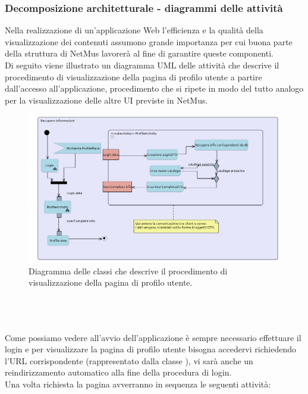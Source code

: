 \subsubsection{Decomposizione architetturale - diagrammi delle attivit\`a}
Nella realizzazione di un'applicazione Web l'efficienza e la
qualit\`a della visualizzazione dei contenuti assumono grande importanza per cui
buona parte della struttura di NetMus lavorer\`a al fine di garantire queste
componenti. \\
Di seguito viene illustrato un diagramma UML delle attivit\`a che descrive il
procedimento di visualizzazione della pagina di profilo utente a partire
dall'accesso all'applicazione, procedimento che si ripete in modo del tutto
analogo per la visualizzazione delle altre UI previste in NetMus.
\begin{figure}[h]
  \centering
  \includegraphics[width=16.5cm]{img/ST/profile.png}
\caption{Diagramma delle classi che descrive il procedimento di
visualizzazione della pagina di profilo utente.}
\end{figure}
\\\\\\Come possiamo vedere all'avvio dell'applicazione \`e sempre necessario
effettuare il login e per visualizzare la pagina di profilo utente bisogna accedervi
richiedendo l'URL corrispondente (rappresentato dalla classe ),
vi sar\`a anche un reindirizzamento automatico alla fine della procedura di
login.\\ 
Una volta richiesta la pagina avverranno in sequenza le seguenti attivit\`a:
